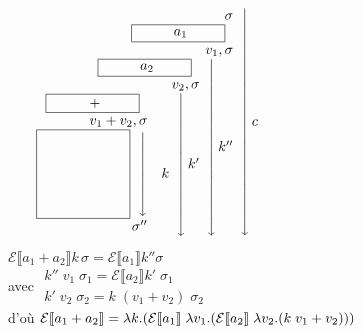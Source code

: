 \documentclass[10pt,a4paper]{article}
\newcommand{\E}{\mathcal{E}}
\newcommand{\semm}[1]{\llbracket #1 \rrbracket }
\begin{document}
\begin{definition}[$\mathcal{E}\semm{a}$]
$ \left.\begin{array}{r l}
     \sigma \\
  \fbox{
 \begin{minipage}{2cm}
 \centering $a_1$
 \end{minipage}} \hspace{0.2cm}  \\
    v_1, \sigma\\
      \left.\begin{array}{r l}
       \fbox{ \begin{minipage}{2cm}
	\centering$a_2$
	 \end{minipage}} \hspace{0.2cm}  \\
	 v_2, \sigma\\
		\left.\begin{array}{r l}
		\fbox{ \begin{minipage}{2cm}
		\centering$+$
		\end{minipage}} \hspace{0.2cm}  \\
		v_1 + v_2, \sigma\\
 \left.\fbox{ \begin{minipage}{2cm}
 \vspace{2cm} \quad
 \end{minipage}} \hspace{0.2cm} \right\downarrow& k \\
  \sigma''
\end{array}\right\downarrow k'\end{array}\right\downarrow k''\end{array}\right\downarrow c$\qquad
\begin{minipage}{200pt}
$\E\semm{a_1 + a_2} k \, \sigma = \E\semm{a_1} k'' \sigma$\\
avec $\begin{array}{l}
      k'' \; v_1 \; \sigma_1 = \E \semm{a_2} k' \;\sigma_1\\
      k' \;v_2\; \sigma_2 = k \;(v_1 + v_2) \;\sigma_2
     \end{array}$\\
d'où $\E\semm{a_1 + a_2} = \\ \lambda k . ( \E\semm{a_1} \; \lambda v_1 . (\E\semm{a_2} \; \lambda v_2. ( k \; v_1 + v_2)))$
\end{minipage}

\end{definition}
\end{document}
